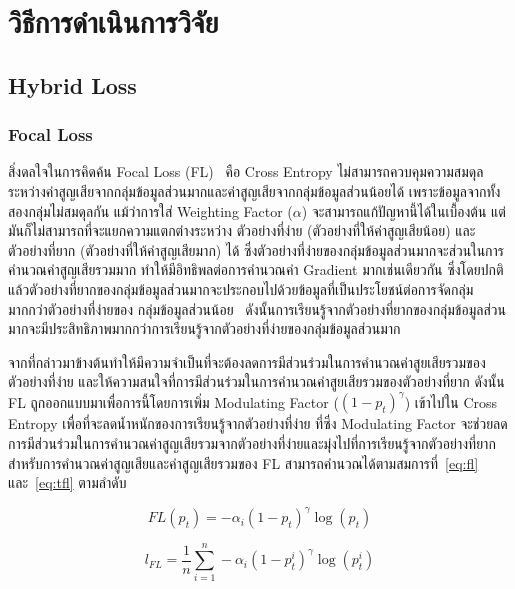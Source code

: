 \chapter{วิธีการดำเนินการวิจัย}
\label{chapter:experiment}

\section{Hybrid Loss}
\subsection{Focal Loss}
สิ่งดลใจในการคิดค้น Focal Loss (FL)~\cite{Lin:2017} คือ Cross Entropy ไม่สามารถควบคุมความสมดุลระหว่างค่าสูญเสียจากกลุ่มข้อมูลส่วนมากและค่าสูญเสียจากกลุ่มข้อมูลส่วนน้อยได้ เพราะข้อมูลจากทั้งสองกลุ่มไม่สมดุลกัน แม้ว่าการใส่ Weighting Factor ($\alpha$) จะสามารถแก้ปัญหานี้ได้ในเบื้องต้น แต่มันก็ไม่สามารถที่จะแยกความแตกต่างระหว่าง ตัวอย่างที่ง่าย (ตัวอย่างที่ให้ค่าสูญเสียน้อย) และ ตัวอย่างที่ยาก (ตัวอย่างที่ให้ค่าสูญเสียมาก) ได้ ซึ่งตัวอย่างที่ง่ายของกลุ่มข้อมูลส่วนมากจะส่วนในการคำนวณค่าสูญเสียรวมมาก ทำให้มีอิทธิพลต่อการคำนวณค่า Gradient มากเช่นเดียวกัน ซึ่งโดยปกติแล้วตัวอย่างที่ยากของกลุ่มข้อมูลส่วนมากจะประกอบไปด้วยข้อมูลที่เป็นประโยชน์ต่อการจัดกลุ่มมากกว่าตัวอย่างที่ง่ายของ
กลุ่มข้อมูลส่วนน้อย~\cite{Zhu:2019} ดังนั้นการเรียนรู้จากตัวอย่างที่ยากของกลุ่มข้อมูลส่วนมากจะมีประสิทธิภาพมากกว่าการเรียนรู้จากตัวอย่างที่ง่ายของกลุ่มข้อมูลส่วนมาก

จากที่กล่าวมาข้างต้นทำให้มีความจำเป็นที่จะต้องลดการมีส่วนร่วมในการคำนวณค่าสูยเสียรวมของตัวอย่างที่ง่าย และให้ความสนใจที่การมีส่วนร่วมในการคำนวณค่าสูยเสียรวมของตัวอย่างที่ยาก ดังนั้น FL ถูกออกแบบมาเพื่อการนี้โดยการเพิ่ม Modulating Factor ($(1 - p_{t})^{\gamma}$) เข้าไปใน Cross Entropy เพื่อที่จะลดน้ำหนักของการเรียนรู้จากตัวอย่างที่ง่าย ที่ซึ่ง Modulating Factor จะช่วยลดการมีส่วนร่วมในการคำนวณค่าสูญเสียรวมจากตัวอย่างที่ง่ายและมุ่งไปที่การเรียนรู้จากตัวอย่างที่ยาก สำหรับการคำนวณค่าสูญเสียและค่าสูญเสียรวมของ FL สามารถคำนวณได้ตามสมการที่~\ref{eq:fl} และ~\ref{eq:tfl} ตามลำดับ

\begin{equation} \label{eq:fl}
FL(p_{t}) = - \alpha_{i}(1 - p_{t})^\gamma \log (p_{t})
\end{equation}

\begin{equation} \label{eq:tfl}
    l_{FL} = \frac{1}{n} \sum_{i = 1}^{n} -\alpha_{i}(1 - p_{t}^{i})^{\gamma}\log (p_{t}^{i})
\end{equation}

